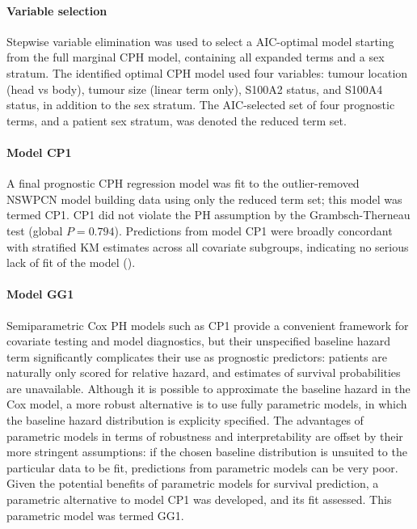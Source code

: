 \documentclass[dissertation.tex]{subfiles}
\begin{document}
\paragraph{Variable selection}
Stepwise variable elimination was used to select a \gls{AIC}-optimal model starting from the full marginal \gls{CPH} model, containing all expanded terms and a sex stratum.  The identified optimal \gls{CPH} model used four variables: tumour location (head vs body), tumour size (linear term only), S100A2 status, and S100A4 status, in addition to the sex stratum.  The \gls{AIC}-selected set of four prognostic terms, and a patient sex stratum, was denoted the reduced term set.

\paragraph{Model CP1}
A final prognostic \acrshort{CPH} regression model was fit to the outlier-removed \gls{NSWPCN} model building data using only the reduced term set; this model was termed CP1.  CP1 did not violate the \gls{PH} assumption by the Grambsch-Therneau test (global $P = 0.794$).  Predictions from model CP1 were broadly concordant with stratified \gls{KM} estimates across all covariate subgroups, indicating no serious lack of fit of the model ().

\paragraph{Model GG1}
Semiparametric Cox \gls{PH} models such as CP1 provide a convenient framework for covariate testing and model diagnostics, but their unspecified baseline hazard term significantly complicates their use as prognostic predictors: patients are naturally only scored for relative hazard, and estimates of survival probabilities are unavailable.  Although it is possible to approximate the baseline hazard in the Cox model, a more robust alternative is to use fully parametric models, in which the baseline hazard distribution is explicity specified.  The advantages of parametric models in terms of robustness and interpretability are offset by their more stringent assumptions: if the chosen baseline distribution is unsuited to the particular data to be fit, predictions from parametric models can be very poor.  Given the potential benefits of parametric models for survival prediction, a parametric alternative to model CP1 was developed, and its fit assessed.  This parametric model was termed GG1.
\end{document}
